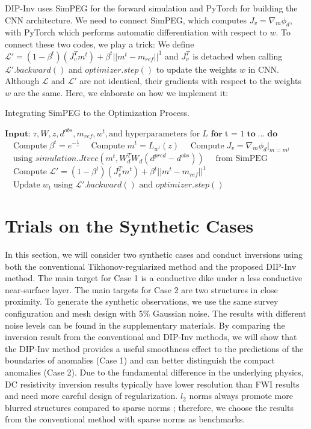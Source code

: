 \documentclass[lettersize,journal]{IEEEtran}
\begin{document}
DIP-Inv uses SimPEG for the forward simulation and PyTorch for building the CNN architecture. We need to connect SimPEG, which computes $J_v = \nabla_m \phi_d$, with PyTorch which performs automatic differentiation with respect to $w$. To connect these two codes, we play a trick: We define $\mathcal{L'} =(1-\beta^t)(J_v^T m^t) + \beta^t ||m^t - m_{ref}||^1$ and $J_v^T$ is detached when calling $\mathcal{L'}.backward()$ and $optimizer.step()$ to update the weights $w$ in CNN. Although $\mathcal{L}$ and $\mathcal{L'}$ are not identical, their gradients with respect to the weights $w$ are the same. Here, we elaborate on how we implement it:
\begin{algorithm}[H]
\caption{Integrating SimPEG to the Optimization Process.}\label{alg:alg1}
\begin{algorithmic}
\STATE 
\STATE ${\textbf{Input:}}\; \tau, W, z, d^{obs}, m_{ref}, w^t, \textrm{and hyperparameters for} \;L$
\STATE $\textbf{for}\; \textrm{t = 1}\; \textbf{to}\; \textrm{...}\; \textbf{do}$
\STATE $\quad\textrm{Compute}\; \beta^t = e^{-\frac{t}{\tau}}$
\STATE $\quad\textrm{Compute}\; m^t = L_{w^t} (z)$
\STATE $\quad\textrm{Compute}\; J_v = \nabla_m \phi_d |_{m=m^t}$
\STATE $\quad\textrm{using $simulation.Jtvec(m^t, W_d^T W_d(d^{pred} - d^{obs}))$}$
\STATE $\quad\textrm{from SimPEG}$
\STATE $\quad\textrm{Compute}\;\mathcal{L'} =(1-\beta^t)(J_v^T m^t) + \beta^t ||m^t - m_{ref}||^1$
\STATE $\quad\textrm{Update}\; w_t \; \textrm{using $\mathcal{L'}.backward()$ and $optimizer.step()$} \;$
\end{algorithmic}
\label{alg1}
\end{algorithm}

\section{Trials on the Synthetic Cases}
\label{sec:3}
In this section, we will consider two synthetic cases and conduct inversions using both the conventional Tikhonov-regularized method and the proposed DIP-Inv method. The main target for Case 1 is a conductive dike under a less conductive near-surface layer. The main targets for Case 2 are two structures in close proximity. To generate the synthetic observations, we use the same survey configuration and mesh design with 5$\%$ Gaussian noise. The results with different noise levels can be found in the supplementary materials. By comparing the inversion result from the conventional and DIP-Inv methods, we will show that the DIP-Inv method provides a useful smoothness effect to the predictions of the boundaries of anomalies (Case 1) and can better distinguish the compact anomalies (Case 2). Due to the fundamental difference in the underlying physics, DC resistivity inversion results typically have lower resolution than FWI results and need more careful design of regularization. $l_2$ norms always promote more blurred structures compared to sparse norms \cite{ref36}; therefore, we choose the results from the conventional method with sparse norms as benchmarks. 
\end{document}
